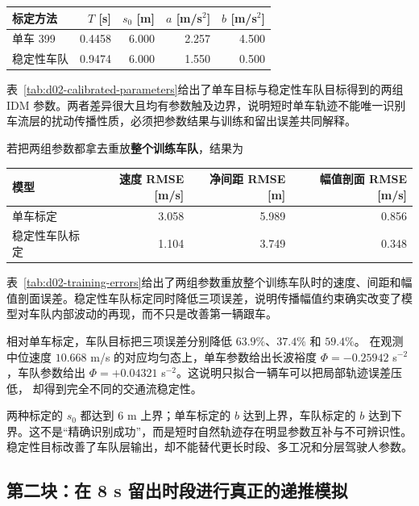 \documentclass[11pt,a4paper,openany]{book}
\numberwithin{equation}{chapter}
\numberwithin{figure}{chapter}
\numberwithin{table}{chapter}
\newcommand{\tabletext}[2]{%
  \par\smallskip\noindent
  表~\ref{#1}给出了#2
  \par\smallskip
}
\begin{document}
\begin{center}
\small
{}
\label{tab:d02-calibrated-parameters}
\begin{tabular}{p{3.7cm}rrrr}
\toprule
\textbf{标定方法} & $T$ [s] & $s_0$ [m] & $a$ [m/s$^2$] & $b$ [m/s$^2$]\\
\midrule
单车 399 & 0.4458 & 6.000 & 2.257 & 4.500\\
稳定性车队 & 0.9474 & 6.000 & 1.550 & 0.500\\
\bottomrule
\end{tabular}
\end{center}
\tabletext{tab:d02-calibrated-parameters}{单车目标与稳定性车队目标得到的两组 IDM 参数。两者差异很大且均有参数触及边界，说明短时单车轨迹不能唯一识别车流层的扰动传播性质，必须把参数结果与训练和留出误差共同解释。}
若把两组参数都拿去重放\textbf{整个训练车队}，结果为
\begin{center}
\small
{}
\label{tab:d02-training-errors}
\begin{tabular}{p{3.7cm}rrr}
\toprule
\textbf{模型} & 速度 RMSE [m/s] & 净间距 RMSE [m] & 幅值剖面 RMSE [m/s]\\
\midrule
单车标定 & 3.058 & 5.989 & 0.856\\
稳定性车队标定 & 1.104 & 3.749 & 0.348\\
\bottomrule
\end{tabular}
\end{center}
\tabletext{tab:d02-training-errors}{两组参数重放整个训练车队时的速度、间距和幅值剖面误差。稳定性车队标定同时降低三项误差，说明传播幅值约束确实改变了模型对车队内部波动的再现，而不只是改善第一辆跟车。}
相对单车标定，车队目标把三项误差分别降低 $63.9\%$、$37.4\%$ 和 $59.4\%$。
在观测中位速度 $10.668$ m/s 的对应均匀态上，单车参数给出长波裕度
$\Phi=-0.25942$ s$^{-2}$，车队参数给出
$\Phi=+0.04321$ s$^{-2}$。这说明只拟合一辆车可以把局部轨迹误差压低，
却得到完全不同的交通流稳定性。

\begin{tcolorbox}[notebox,title=\textbf{参数碰到边界说明什么？}]
两种标定的 $s_0$ 都达到 6 m 上界；单车标定的 $b$ 达到上界，车队标定的 $b$
达到下界。这不是“精确识别成功”，而是短时自然轨迹存在明显参数互补与不可辨识性。
稳定性目标改善了车队层输出，却不能替代更长时段、多工况和分层驾驶人参数。
\end{tcolorbox}

\subsection{第二块：在 8 s 留出时段进行真正的递推模拟}
\end{document}
